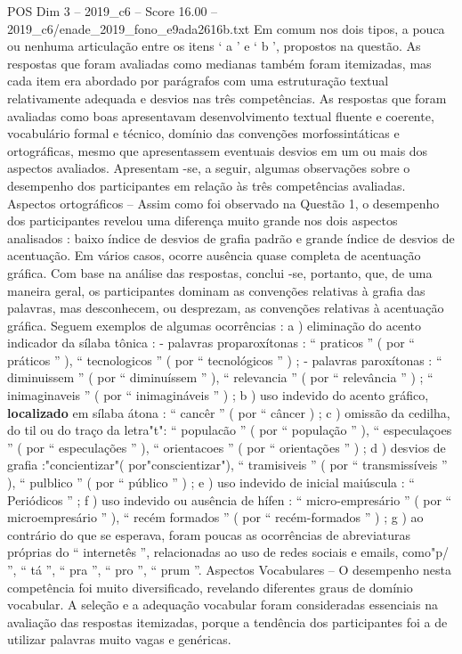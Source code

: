 \begin{textsample}{POS Dim 3 – 2019\_c6 – Score 16.00 – 2019\_c6/enade\_2019\_fono\_e9ada2616b.txt}
Em comum nos dois tipos, a pouca ou nenhuma articulação entre os itens ‘ a ’ e ‘ b ’, propostos na questão.
As respostas que foram avaliadas como medianas também foram itemizadas, mas cada item era abordado por parágrafos com uma estruturação textual relativamente adequada e desvios nas três competências.
As respostas que foram avaliadas como boas apresentavam desenvolvimento textual fluente e coerente, vocabulário formal e técnico, domínio das convenções morfossintáticas e ortográficas, mesmo que apresentassem eventuais desvios em um ou mais dos aspectos avaliados.
Apresentam -se, a seguir, algumas observações sobre o desempenho dos participantes em relação às três competências avaliadas.
Aspectos ortográficos – Assim como foi observado na Questão 1, o desempenho dos participantes revelou uma diferença muito grande nos dois aspectos analisados : baixo índice de desvios de grafia padrão e grande índice de desvios de acentuação.
Em vários casos, ocorre ausência quase completa de acentuação gráfica.
Com base na análise das respostas, conclui -se, portanto, que, de uma maneira geral, os participantes dominam as convenções relativas à grafia das palavras, mas desconhecem, ou desprezam, as convenções relativas à acentuação gráfica.
Seguem exemplos de algumas ocorrências : a ) eliminação do acento indicador da sílaba tônica : - palavras proparoxítonas : “ praticos ” ( por “ práticos ” ), “ tecnologicos ” ( por “ tecnológicos ” ) ; - palavras paroxítonas : “ diminuissem ” ( por “ diminuíssem ” ), “ relevancia ” ( por “ relevância ” ) ; “ inimaginaveis ” ( por “ inimagináveis ” ) ; b ) uso indevido do acento gráfico, \textbf{localizado} em sílaba átona : “ cancêr ” ( por “ câncer ) ; c ) omissão da cedilha, do til ou do traço da letra"t": “ populacão ” ( por “ população ” ), “ especulaçoes ” ( por “ especulações ” ), “ orientacoes ” ( por “ orientações ” ) ; d ) desvios de grafia :"concientizar"( por"conscientizar"), “ tramisiveis ” ( por “ transmissíveis ” ), “ pulblico ” ( por “ público ” ) ; e ) uso indevido de inicial maiúscula : “ Periódicos ” ; f ) uso indevido ou ausência de hífen : “ micro-empresário ” ( por “ microempresário ” ), “ recém formados ” ( por “ recém-formados ” ) ; g ) ao contrário do que se esperava, foram poucas as ocorrências de abreviaturas próprias do “ internetês ”, relacionadas ao uso de redes sociais e emails, como"p/ ”, “ tá ”, “ pra ”, “ pro ”, “ prum ”.
Aspectos Vocabulares – O desempenho nesta competência foi muito diversificado, revelando diferentes graus de domínio vocabular.
A seleção e a adequação vocabular foram consideradas essenciais na avaliação das respostas itemizadas, porque a tendência dos participantes foi a de utilizar palavras muito vagas e genéricas.

\end{textsample}
